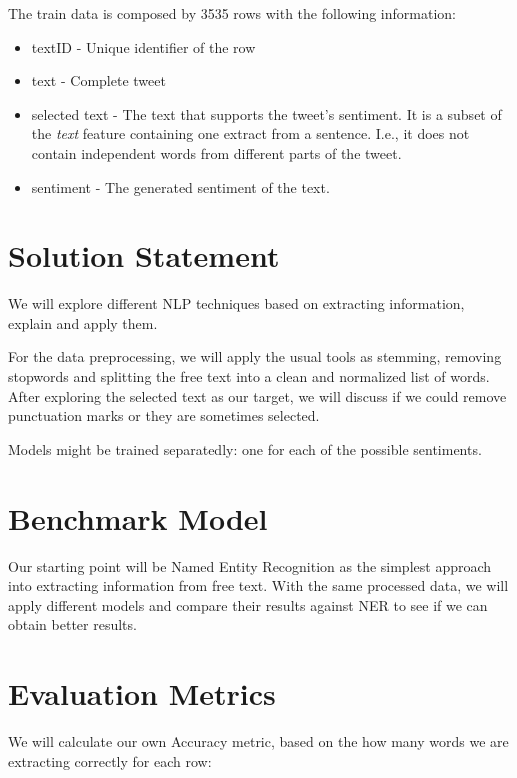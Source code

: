 \documentclass[11pt]{article}
\begin{document}
The train data is composed by 3535 rows with the following information:
\begin{itemize}
    \item textID - Unique identifier of the row
    \item text - Complete tweet
    \item selected text - The text that supports the tweet's sentiment. It is a subset of the \textit{text} feature containing one extract from a sentence. I.e., it does not contain independent words from different parts of the tweet.
    \item sentiment - The generated sentiment of the text.
\end{itemize}

\section{Solution Statement}

We will explore different NLP techniques based on extracting information, explain and apply them.

For the data preprocessing, we will apply the usual tools as stemming, removing stopwords and splitting the free text into a clean and normalized list of words. After exploring the selected text as our target, we will discuss if we could remove punctuation marks or they are sometimes selected.

Models might be trained separatedly: one for each of the possible sentiments.

\section{Benchmark Model}

Our starting point will be Named Entity Recognition as the simplest approach into extracting information from free text.
With the same processed data, we will apply different models and compare their results against NER to see if we can obtain better results.



\section{Evaluation Metrics}

We will calculate our own Accuracy metric, based on the how many words we are extracting correctly for each row:
\end{document}
